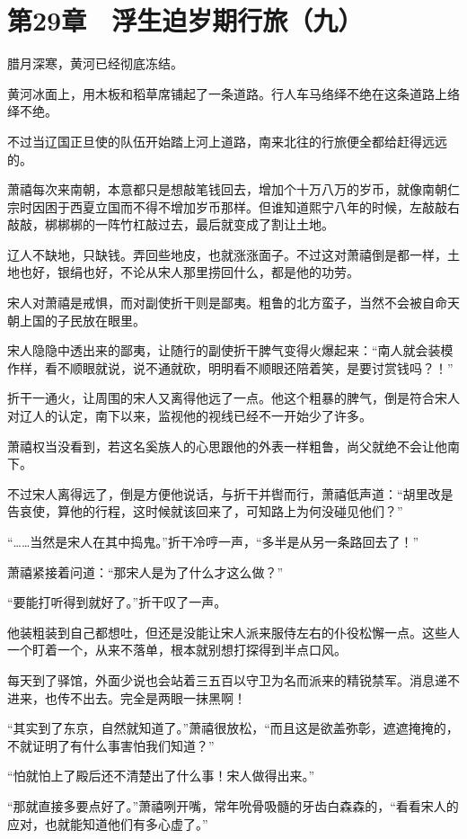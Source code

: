 \section{第29章　浮生迫岁期行旅（九）}

腊月深寒，黄河已经彻底冻结。

黄河冰面上，用木板和稻草席铺起了一条道路。行人车马络绎不绝在这条道路上络绎不绝。

不过当辽国正旦使的队伍开始踏上河上道路，南来北往的行旅便全都给赶得远远的。

萧禧每次来南朝，本意都只是想敲笔钱回去，增加个十万八万的岁币，就像南朝仁宗时因困于西夏立国而不得不增加岁币那样。但谁知道熙宁八年的时候，左敲敲右敲敲，梆梆梆的一阵竹杠敲过去，最后就变成了割让土地。

辽人不缺地，只缺钱。弄回些地皮，也就涨涨面子。不过这对萧禧倒是都一样，土地也好，银绢也好，不论从宋人那里捞回什么，都是他的功劳。

宋人对萧禧是戒惧，而对副使折干则是鄙夷。粗鲁的北方蛮子，当然不会被自命天朝上国的子民放在眼里。

宋人隐隐中透出来的鄙夷，让随行的副使折干脾气变得火爆起来：“南人就会装模作样，看不顺眼就说，说不通就砍，明明看不顺眼还陪着笑，是要讨赏钱吗？！”

折干一通火，让周围的宋人又离得他远了一点。他这个粗暴的脾气，倒是符合宋人对辽人的认定，南下以来，监视他的视线已经不一开始少了许多。

萧禧权当没看到，若这名奚族人的心思跟他的外表一样粗鲁，尚父就绝不会让他南下。

不过宋人离得远了，倒是方便他说话，与折干并辔而行，萧禧低声道：“胡里改是告哀使，算他的行程，这时候就该回来了，可知路上为何没碰见他们？”

“……当然是宋人在其中捣鬼。”折干冷哼一声，“多半是从另一条路回去了！”

萧禧紧接着问道：“那宋人是为了什么才这么做？”

“要能打听得到就好了。”折干叹了一声。

他装粗装到自己都想吐，但还是没能让宋人派来服侍左右的仆役松懈一点。这些人一个盯着一个，从来不落单，根本就别想打探得到半点口风。

每天到了驿馆，外面少说也会站着三五百以守卫为名而派来的精锐禁军。消息递不进来，也传不出去。完全是两眼一抹黑啊！

“其实到了东京，自然就知道了。”萧禧很放松，“而且这是欲盖弥彰，遮遮掩掩的，不就证明了有什么事害怕我们知道？”

“怕就怕上了殿后还不清楚出了什么事！宋人做得出来。”

“那就直接多要点好了。”萧禧咧开嘴，常年吮骨吸髓的牙齿白森森的，“看看宋人的应对，也就能知道他们有多心虚了。”

